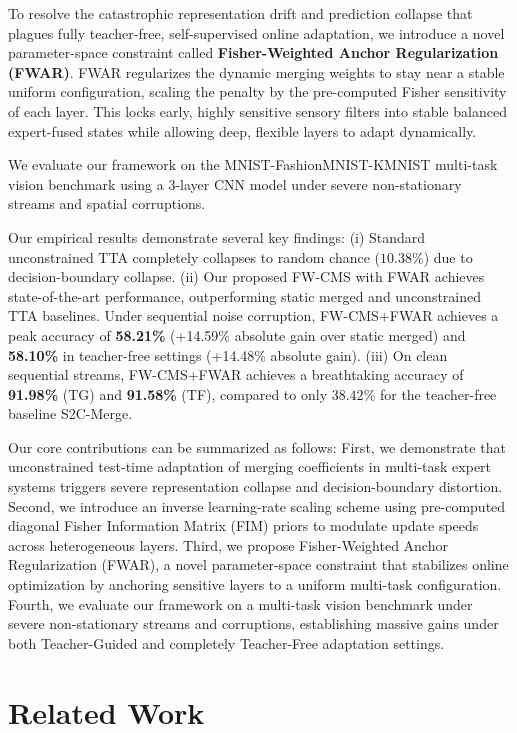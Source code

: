 \documentclass{article}
\begin{document}
To resolve the catastrophic representation drift and prediction collapse that plagues fully teacher-free, self-supervised online adaptation, we introduce a novel parameter-space constraint called \textbf{Fisher-Weighted Anchor Regularization (FWAR)}. FWAR regularizes the dynamic merging weights to stay near a stable uniform configuration, scaling the penalty by the pre-computed Fisher sensitivity of each layer. This locks early, highly sensitive sensory filters into stable balanced expert-fused states while allowing deep, flexible layers to adapt dynamically.

We evaluate our framework on the MNIST-FashionMNIST-KMNIST multi-task vision benchmark using a 3-layer CNN model under severe non-stationary streams and spatial corruptions. 

Our empirical results demonstrate several key findings: (i) Standard unconstrained TTA completely collapses to random chance ($10.38\%$) due to decision-boundary collapse. (ii) Our proposed FW-CMS with FWAR achieves state-of-the-art performance, outperforming static merged and unconstrained TTA baselines. Under sequential noise corruption, FW-CMS+FWAR achieves a peak accuracy of \textbf{58.21\%} (+14.59\% absolute gain over static merged) and \textbf{58.10\%} in teacher-free settings (+14.48\% absolute gain). (iii) On clean sequential streams, FW-CMS+FWAR achieves a breathtaking accuracy of \textbf{91.98\%} (TG) and \textbf{91.58\%} (TF), compared to only $38.42\%$ for the teacher-free baseline S2C-Merge.

Our core contributions can be summarized as follows:
First, we demonstrate that unconstrained test-time adaptation of merging coefficients in multi-task expert systems triggers severe representation collapse and decision-boundary distortion.
Second, we introduce an inverse learning-rate scaling scheme using pre-computed diagonal Fisher Information Matrix (FIM) priors to modulate update speeds across heterogeneous layers.
Third, we propose Fisher-Weighted Anchor Regularization (FWAR), a novel parameter-space constraint that stabilizes online optimization by anchoring sensitive layers to a uniform multi-task configuration.
Fourth, we evaluate our framework on a multi-task vision benchmark under severe non-stationary streams and corruptions, establishing massive gains under both Teacher-Guided and completely Teacher-Free adaptation settings.

\section{Related Work}
\label{sec:related}
\end{document}
